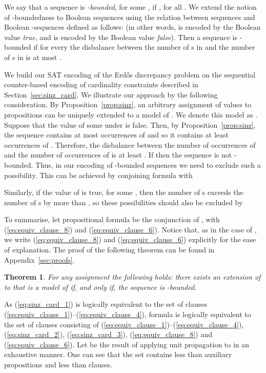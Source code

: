 \documentclass{article} \usepackage[utf8]{inputenc}
\newtheorem{theorem}{Theorem}
\begin{document}
We say that a  sequence  is \emph{-bounded}, for some ,
if  , for all .
We extend the notion of -boundedness to Boolean  sequences using the 
relation between  sequences  and Boolean
-sequences  defined as follows:  (in other
words,  is encoded by the Boolean value \emph{true}, and  is encoded by
the Boolean value \emph{false}). Then a  sequence 
 is -bounded if for every  
the disbalance between the number of s in  and the 
number of s in  is at most .

We build our SAT encoding of the Erd\H{o}s discrepancy problem on 
the sequential counter-based encoding of cardinality constraints described
in Section~\ref{sec:sinz_card}. We illustrate our approach by the following consideration.
By Proposition~\ref{prop:sinz}, an arbitrary 
assignment of  values to propositions  can be uniquely 
extended to a model of . We 
denote this model as .
Suppose that the value of some  under  is false.
Then, by Proposition~\ref{prop:sinz}, the sequence  
contains at most  occurrences of  and so it contains at least 
occurrences of . Therefore, the disbalance between the number of occurrences
of  and the number of occurrences of  is at least .  If
 then the sequence  is not -bounded. 
Thus, in our encoding of  -bounded sequences we need to exclude such a possibility.
This can be achieved by conjoining formula   with


Similarly, if the value of  is true, for some , then 
the number of s exceeds the number of s by more than , so these
possibilities should also be excluded by


To summarise, let propositional formula  be the conjunction of ,
with (\ref{eq:equiv_clause_8}) and
(\ref{eq:equiv_clause_6}).
Notice that, as in the case of  , 
we write (\ref{eq:equiv_clause_8}) and (\ref{eq:equiv_clause_6}) explicitly
for the ease of explanation. The proof of the following theorem can 
be found in Appendix~\ref{sec:proofs}.
\begin{theorem}\label{th:cbounded}
For any assignment  the following holds: 
there exists an extension of  to  that is 
a model of  if, and only if, 
the sequence  is -bounded.
\end{theorem}



As (\ref{eq:sinz_card_1}) is logically equivalent to the set of clauses
(\ref{eq:equiv_clause_1})--(\ref{eq:equiv_clause_4}), formula 
  is logically equivalent to 
the set of clauses  consisting of 
(\ref{eq:equiv_clause_1})--(\ref{eq:equiv_clause_4}), 
(\ref{eq:sinz_card_2}), 
(\ref{eq:sinz_card_3}), 
(\ref{eq:equiv_clause_8})
and
(\ref{eq:equiv_clause_6}). 
Let  be the result of applying unit propagation to  in an 
exhaustive manner.
One can see that
the set  contains less than  auxiliary propositions
and less than  clauses.
\end{document}
